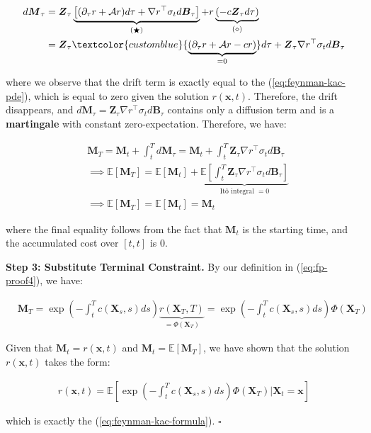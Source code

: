 \documentclass{article}
\newcommand{\bluetext}[1]{\textcolor{customblue}{#1}}
\begin{document}
\begin{small}
\begin{align}
    d\boldsymbol{M}_\tau&=\boldsymbol{Z}_\tau\underbrace{\left[(\partial_\tau r+\mathcal{A}r)d\tau+\nabla r^\top \sigma_td\boldsymbol{B}_\tau\right]}_{(\bigstar)}+ r\underbrace{\left(-c\boldsymbol{Z}_\tau d\tau\right)}_{(\diamond)}\nonumber\\
    &=\boldsymbol{Z}_\tau\bluetext{\underbrace{\left(\partial_\tau r+\mathcal{A}r-cr\right)}_{=0}}d\tau+ \boldsymbol{Z}_\tau\nabla r^\top \sigma_td\boldsymbol{B}_\tau
\end{align}
\end{small}
where we observe that the drift term is exactly equal to the (\ref{eq:feynman-kac-pde}), which is equal to zero given the solution $r(\boldsymbol{x},t)$. Therefore, the drift disappears, and $d\boldsymbol{M}_\tau=\boldsymbol{Z}_\tau\nabla r^\top \sigma_td\boldsymbol{B}_\tau$ contains only a diffusion term and is a \textbf{martingale} with constant zero-expectation. Therefore, we have:
\begin{small}
\begin{align}
    &\boldsymbol{M}_T=\boldsymbol{M}_t+ \int _t^Td\boldsymbol{M}_\tau=\boldsymbol{M}_t+\int_t^T\boldsymbol{Z}_\tau\nabla r^\top \sigma_td\boldsymbol{B}_\tau\nonumber\\
    &\implies \mathbb{E}[\boldsymbol{M}_T]=\mathbb{E}[\boldsymbol{M}_t]+\underbrace{\mathbb{E}\left[\int_t^T\boldsymbol{Z}_\tau\nabla r^\top \sigma_td\boldsymbol{B}_\tau\right]}_{\text{Itô integral }=0}\nonumber\\
    &\implies \mathbb{E}[\boldsymbol{M}_T]=\mathbb{E}[\boldsymbol{M}_t]=\boldsymbol{M}_t
\end{align}
\end{small}
where the final equality follows from the fact that $\boldsymbol{M}_t$ is the starting time, and the accumulated cost over $[t,t]$ is 0.

\textbf{Step 3: Substitute Terminal Constraint. }
By our definition in (\ref{eq:fp-proof4}), we have:
\begin{small}
\begin{align}
    &\boldsymbol{M}_T=\exp \left(-\int_t^Tc(\boldsymbol{X}_s,s)ds\right)\underbrace{r(\boldsymbol{X}_T,T)}_{=\Phi(\boldsymbol{X}_T)}=\exp \left(-\int_t^Tc(\boldsymbol{X}_s,s)ds\right)\Phi(\boldsymbol{X}_T)
\end{align}
\end{small}
Given that $\boldsymbol{M}_t=r(\boldsymbol{x},t)$ and $\boldsymbol{M}_t=\mathbb{E}[\boldsymbol{M}_T]$, we have shown that the solution $r(\boldsymbol{x},t)$ takes the form:
\begin{small}
\begin{align}
    \boxed{r(\boldsymbol{x},t)=\mathbb{E}\left[\exp \left(-\int_t^Tc(\boldsymbol{X}_s,s)ds\right)\Phi(\boldsymbol{X}_T)\bigg|\boldsymbol{X}_t=\boldsymbol{x}\right]}\tag{Feynman-Kac Formula}
\end{align}
\end{small}
which is exactly the (\ref{eq:feynman-kac-formula}). \hfill $\square$
\end{document}
